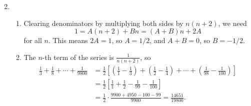 \begin{enumerate}
\begin{equation*}
\end{equation*}
\item \begin{enumerate}
\item Clearing denominators by multiplying both sides by $n(n + 2)$, we need
\begin{equation*}
1 = A(n + 2) + Bn = (A + B)n + 2A
\end{equation*}
for all $n$. This means $2A = 1$, so $A = 1/2$, and $A + B = 0$, so $B = -1/2$.
\item The $n$-th term of the series is $\tfrac{1}{n(n + 2)}$, so 
\begin{align*} 
\frac{1}{3} + \frac{1}{8} + \cdots + \frac{1}{9800} &= \frac{1}{2}\left[\left(\frac{1}{1} - \frac{1}{3}\right) + \left(\frac{1}{2} - \frac{1}{4}\right) + \cdots + \left(\frac{1}{98} - \frac{1}{100}\right)\right] \\
&= \frac{1}{2}\left[\frac{1}{1} + \frac{1}{2} - \frac{1}{99} - \frac{1}{100}\right] \\
&= \frac{1}{2}\cdot\frac{9900 + 4950 - 100 - 99}{9900} = \frac{14651}{19800}.
\end{align*} 
\end{enumerate}
\end{enumerate}
